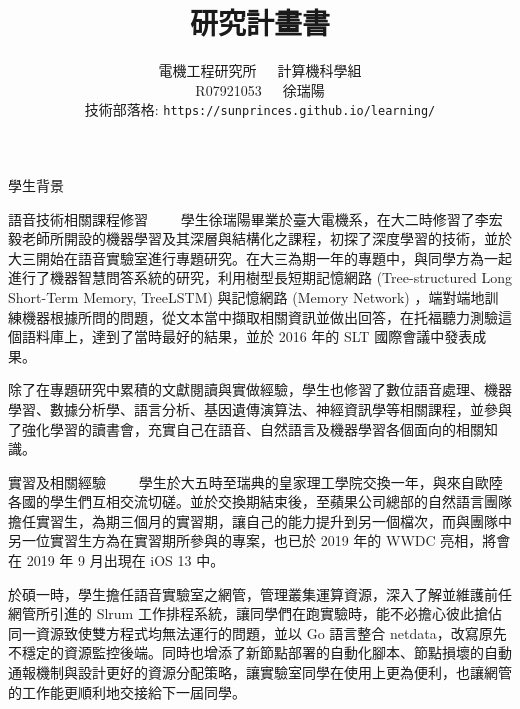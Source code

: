 \documentclass[12pt]{extarticle}
\title{研究計畫書}
\author{電機工程研究所~~~計算機科學組\\R07921053~~~徐瑞陽 \\ 技術部落格: \texttt{https://sunprinces.github.io/learning/}}
\date{}
\begin{document}
\maketitle

\begin{section}{學生背景}
  \begin{subsection}{語音技術相關課程修習}
~~~~學生徐瑞陽畢業於臺大電機系，在大二時修習了李宏毅老師所開設的機器學習及其深層與結構化之課程，初探了深度學習的技術，並於大三開始在語音實驗室進行專題研究。在大三為期一年的專題中，與同學方為一起進行了機器智慧問答系統的研究，利用樹型長短期記憶網路 (Tree-structured Long Short-Term Memory, TreeLSTM) 與記憶網路 (Memory Network) ，端對端地訓練機器根據所問的問題，從文本當中擷取相關資訊並做出回答，在托福聽力測驗這個語料庫上，達到了當時最好的結果，並於 2016 年的 SLT 國際會議中發表成果。

    除了在專題研究中累積的文獻閱讀與實做經驗，學生也修習了數位語音處理、機器學習、數據分析學、語言分析、基因遺傳演算法、神經資訊學等相關課程，並參與了強化學習的讀書會，充實自己在語音、自然語言及機器學習各個面向的相關知識。
  \end{subsection}

  \begin{subsection}{實習及相關經驗}
~~~~學生於大五時至瑞典的皇家理工學院交換一年，與來自歐陸各國的學生們互相交流切磋。並於交換期結束後，至蘋果公司總部的自然語言團隊擔任實習生，為期三個月的實習期，讓自己的能力提升到另一個檔次，而與團隊中另一位實習生方為在實習期所參與的專案，也已於 2019 年的 WWDC 亮相，將會在 2019 年 9 月出現在 iOS 13 中。

    於碩一時，學生擔任語音實驗室之網管，管理叢集運算資源，深入了解並維護前任網管所引進的 Slrum 工作排程系統，讓同學們在跑實驗時，能不必擔心彼此搶佔同一資源致使雙方程式均無法運行的問題，並以 Go 語言整合 netdata，改寫原先不穩定的資源監控後端。同時也增添了新節點部署的自動化腳本、節點損壞的自動通報機制與設計更好的資源分配策略，讓實驗室同學在使用上更為便利，也讓網管的工作能更順利地交接給下一屆同學。
  \end{subsection}
\end{section}
\end{document}
